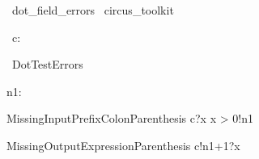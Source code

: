 

\begin{zsection}
  \SECTION\ dot\_field\_errors \parents\ circus\_toolkit
\end{zsection}

\begin{circus}
   \circchannel\ c: \nat \cross \nat
\end{circus}

\begin{circus}
   \circprocess\ DotTestErrors \circdef \circbegin
\end{circus}

\begin{axdef}
   n1: \nat
\end{axdef}

\begin{circusaction}
   MissingInputPrefixColonParenthesis \circdef c?x \prefixcolon x > 0!n1 \then \Skip
\end{circusaction}

\begin{circusaction}
   MissingOutputExpressionParenthesis \circdef c!n1+1?x \then \Skip
\end{circusaction}

\begin{circusaction}
    \circspot \Skip
\end{circusaction}

\begin{circus}
    \circend
\end{circus}
